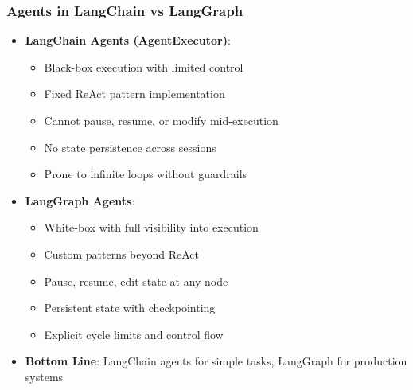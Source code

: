 \begin{frame}[fragile]\frametitle{Agents in LangChain vs LangGraph}
      \begin{itemize}
        \item \textbf{LangChain Agents (AgentExecutor)}:
        \begin{itemize}
            \item Black-box execution with limited control
            \item Fixed ReAct pattern implementation
            \item Cannot pause, resume, or modify mid-execution
            \item No state persistence across sessions
            \item Prone to infinite loops without guardrails
        \end{itemize}
        \item \textbf{LangGraph Agents}:
        \begin{itemize}
            \item White-box with full visibility into execution
            \item Custom patterns beyond ReAct
            \item Pause, resume, edit state at any node
            \item Persistent state with checkpointing
            \item Explicit cycle limits and control flow
        \end{itemize}
        \item \textbf{Bottom Line}: LangChain agents for simple tasks, LangGraph for production systems
      \end{itemize}
\end{frame}


